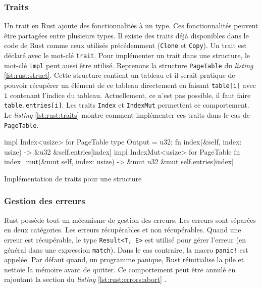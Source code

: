 
\subsubsection{Traits}
Un trait en Rust ajoute des fonctionnalités à un type.
Ces fonctionnalités peuvent être partagées entre plusieurs types. Il existe des
traits déjà disponibles dans le code de Rust comme ceux
utilisés précédemment (\texttt{Clone} et \texttt{Copy}).
Un trait est déclaré avec le mot-clé \texttt{trait}. Pour implémenter
un trait dans une structure, le mot-clé \texttt{impl} peut aussi
être utilisé. Reprenons la structure \texttt{PageTable} du \textit{listing}
\ref{lst:rust:struct}. Cette structure contient un tableau et il serait pratique
de pouvoir récupérer un élément de ce tableau directement en faisant
\texttt{table[i]} avec \texttt{i} contenant l'indice du tableau.
Actuellement, ce n'est pas possible, il faut faire \texttt{table.entries[i]}.
Les traits \texttt{Index} et \texttt{IndexMut} permettent
ce comportement. Le \textit{listing} \ref{lst:rust:traits} montre comment implémenter
ces traits dans le cas de \texttt{PageTable}.

\begin{code}
\begin{rustcode}
impl Index<usize> for PageTable {
    type Output = u32;
    fn index(&self, index: usize) -> &u32 {
        &self.entries[index]
    }
}
impl IndexMut<usize> for PageTable {
    fn index_mut(&mut self, index: usize) -> &mut u32 {
        &mut self.entries[index]
    }
}
\end{rustcode}
\caption{Implémentation de traits pour une structure}
\label{lst:rust:traits}
\end{code}


\subsubsection{Gestion des erreurs}
Rust possède tout un mécanisme de gestion des erreurs. Les erreurs sont séparées
en deux catégories. Les erreurs récupérables et non récupérables. Quand une erreur
est récupérable, le type \texttt{Result<T, E>} est utilisé pour gérer
l'erreur (en général dans une expression \texttt{match}). Dans le cas
contraire, la macro \texttt{panic!} est appelée. Par défaut quand, un
programme panique, Rust réinitialise la pile et nettoie la mémoire avant de quitter.
Ce comportement peut être annulé en rajoutant la section du \textit{listing}
\ref{lst:rust:errors:abort} \cite{ref2}.

